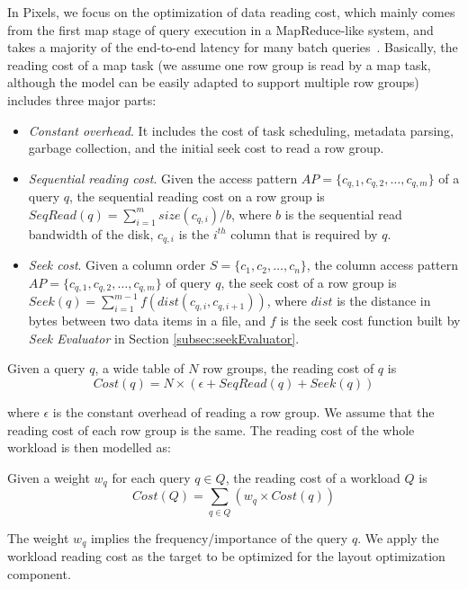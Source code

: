 In Pixels, we focus on the optimization of data reading cost, which mainly comes from the first map stage of query execution in a MapReduce-like system, and takes a majority of the end-to-end latency for many batch queries~\cite{ColumnOrdering}. Basically, the reading cost of a map task (we assume one row group is read by a map task, although the model can be easily adapted to support multiple row groups) includes three major parts:
\begin{itemize}
	\item \textit{Constant overhead}. It includes the cost of task scheduling, metadata parsing, garbage collection, and the initial seek cost to read a row group.
	
	\item \textit{Sequential reading cost}. Given the access pattern $AP=\{c_{q,1},c_{q,2},\dots,c_{q,m}\}$ of a query $q$, the sequential reading cost on a row group is $SeqRead(q)=\sum_{i=1}^{m}size(c_{q,i})/b$, where $b$ is the sequential read bandwidth of the disk, $c_{q,i}$ is the $i^{th}$ column that is required by $q$.
	
	\item \textit{Seek cost}. Given a column order $S=\{c_1, c_2,\dots,c_n\}$, the column access pattern $AP=\{c_{q,1},c_{q,2},\dots,c_{q,m}\}$ of query $q$, the seek cost of a row group is \\$Seek(q)=\sum_{i=1}^{m-1}f(dist(c_{q,i},c_{q,i+1}))$, where $dist$ is the distance in bytes between two data items in a file, and $f$ is the seek cost function built by \textit{Seek Evaluator} in Section \ref{subsec:seekEvaluator}.
\end{itemize}

\begin{Definition}\label{equ:qcost}
	Given a query $q$, a wide table of $N$ row groups, the reading cost of $q$ is
	\begin{equation}
	Cost(q) = N\times(\epsilon+SeqRead(q)+Seek(q))
	\label{equ:querycost}
	\end{equation}
\end{Definition}

where $\epsilon$ is the constant overhead of reading a row group.
We assume that the reading cost of each row group is the same.
The reading cost of the whole workload is then modelled as:

\begin{Definition}\label{equ:wcost}
	Given a weight $w_q$ for each query $q\in Q$, the reading cost of a workload $Q$ is
	\begin{equation}
	Cost(Q) = \sum_{q\in Q}(w_q\times Cost(q))
	\label{equ:workloadcost}
	\end{equation}
\end{Definition}

The weight $w_q$ implies the frequency/importance of the query $q$. We apply the workload reading cost as the target to be optimized for the layout optimization component.


